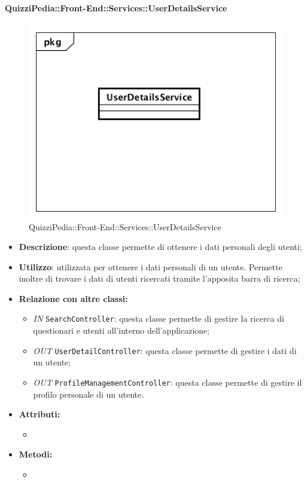 \paragraph{QuizziPedia::Front-End::Services::UserDetailsService}
\begin{figure}
	\centering
	\includegraphics[scale=0.45]{UML/Classi/Front-End/QuizziPedia_Front-end_Services_UserDetailsService.png}
	\caption{QuizziPedia::Front-End::Services::UserDetailsService}
\end{figure}
\begin{itemize}
	\item \textbf{Descrizione}: questa classe permette di ottenere i dati personali degli utenti;
	\item \textbf{Utilizzo}: utilizzata per ottenere i dati personali di un utente. Permette inoltre di trovare i dati di utenti ricercati tramite l'apposita barra di ricerca;
	\item \textbf{Relazione con altre classi:}
	\begin{itemize}
		\item \textit{IN} \texttt{SearchController}: questa classe permette di gestire la ricerca di questionari e utenti all'interno dell'applicazione;
		\item \textit{OUT} \texttt{UserDetailController}: questa classe permette di gestire i dati di un utente;
		\item \textit{OUT} \texttt{ProfileManagementController}: questa classe permette di gestire il profilo personale di un utente. 
	\end{itemize}
	\item \textbf{Attributi:}
	\begin{itemize}
		\item 
	\end{itemize}
	\item \textbf{Metodi:}
	\begin{itemize}
		\item 
	\end{itemize}
\end{itemize}
